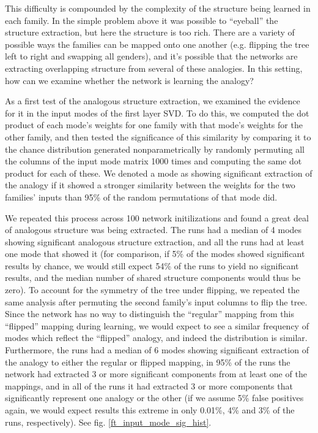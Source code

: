\documentclass[10pt,letterpaper]{article}
\begin{document}
This difficulty is compounded by the complexity of the structure being learned in each family. In the simple problem above it was possible to ``eyeball'' the structure extraction, but here the structure is too rich. There are a variety of possible ways the families can be mapped onto one another (e.g. flipping the tree left to right and swapping all genders), and it's possible that the networks are extracting overlapping structure from several of these analogies. In this setting, how can we examine whether the network is learning the analogy? \par
As a first test of the analogous structure extraction, we examined the evidence for it in the input modes of the first layer SVD. To do this, we computed the dot product of each mode's weights for one family with that mode's weights for the other family, and then tested the significance of this similarity by comparing it to the chance distribution generated nonparametrically by randomly permuting all the columns of the input mode matrix 1000 times and computing the same dot product for each of these. We denoted a mode as showing significant extraction of the analogy if it showed a stronger similarity between the weights for the two families' inputs than 95\% of the random permutations of that mode did. \par
We repeated this process across 100 network initilizations and found a great deal of analogous structure was being extracted. The runs had a median of 4 modes showing significant analogous structure extraction, and all the runs had at least one mode that showed it (for comparison, if 5\% of the modes showed significant results by chance, we would still expect 54\% of the runs to yield no significant results, and the median number of shared structure components would thus be zero). To account for the symmetry of the tree under flipping, we repeated the same analysis after permuting the second family's input columns to flip the tree. Since the network has no way to distinguish the ``regular'' mapping from this ``flipped'' mapping during learning, we would expect to see a similar frequency of modes which reflect the ``flipped'' analogy, and indeed the distribution is similar. Furthermore, the runs had a median of 6 modes showing significant extraction of the analogy to either the regular or flipped mapping, in 95\% of the runs the network had extracted 3 or more significant components from at least one of the mappings, and in all of the runs it had extracted 3 or more components that significantly represent one analogy or the other (if we assume 5\% false positives again, we would expect results this extreme in only 0.01\%, 4\% and 3\% of the runs, respectively). See fig. \ref{ft_input_mode_sig_hist}. \par
\end{document}
